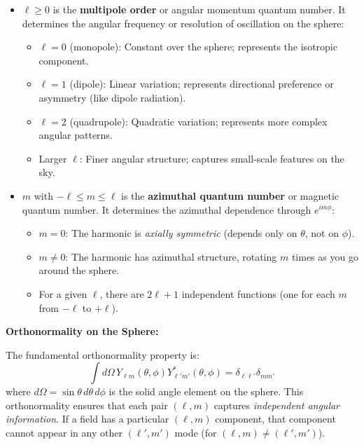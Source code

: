 \begin{itemize}
    \item $\ell \geq 0$ is the \textbf{multipole order} or angular momentum quantum number. It determines the angular frequency or resolution of oscillation on the sphere:
    \begin{itemize}
        \item $\ell = 0$ (monopole): Constant over the sphere; represents the isotropic component.
        \item $\ell = 1$ (dipole): Linear variation; represents directional preference or asymmetry (like dipole radiation).
        \item $\ell = 2$ (quadrupole): Quadratic variation; represents more complex angular patterns.
        \item Larger $\ell$: Finer angular structure; captures small-scale features on the sky.
    \end{itemize}
    
    \item $m$ with $-\ell \leq m \leq \ell$ is the \textbf{azimuthal quantum number} or magnetic quantum number. It determines the azimuthal dependence through $e^{im\phi}$:
    \begin{itemize}
        \item $m = 0$: The harmonic is \emph{axially symmetric} (depends only on $\theta$, not on $\phi$).
        \item $m \neq 0$: The harmonic has azimuthal structure, rotating $m$ times as you go around the sphere.
        \item For a given $\ell$, there are $2\ell + 1$ independent functions (one for each $m$ from $-\ell$ to $+\ell$).
    \end{itemize}
\end{itemize}

\textbf{Orthonormality on the Sphere:}

The fundamental orthonormality property is:
\begin{equation}
\int d\Omega \, Y_{\ell m}(\theta, \phi) Y_{\ell' m'}^*(\theta, \phi) = \delta_{\ell \ell'} \delta_{m m'}
\label{eq:spherical_harmonic_orthonormality}
\end{equation}
where $d\Omega = \sin\theta \, d\theta \, d\phi$ is the solid angle element on the sphere. This orthonormality ensures that each pair $(\ell, m)$ captures \emph{independent angular information}. If a field has a particular $({\ell, m})$ component, that component cannot appear in any other $(\ell', m')$ mode (for $(\ell, m) \neq (\ell', m')$).

